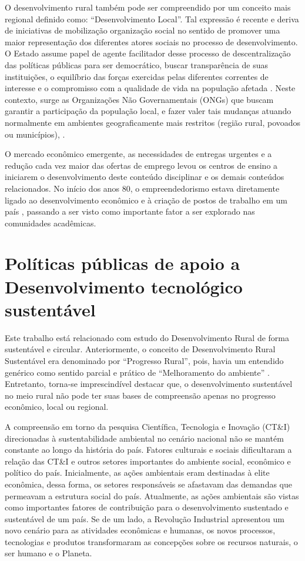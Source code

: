 O desenvolvimento rural também pode ser compreendido por um conceito mais regional definido como: “Desenvolvimento Local”. Tal expressão é recente e deriva de iniciativas de mobilização organização social no sentido de promover uma maior representação dos diferentes atores sociais no processo de desenvolvimento. O Estado assume papel de agente facilitador desse processo de descentralização das políticas públicas para ser democrático, buscar transparência de suas instituições, o equilíbrio das forças exercidas pelas diferentes correntes de interesse e o compromisso com a qualidade de vida na população afetada \cite{castro_agricultura_2017}.
 Neste contexto, surge as Organizações Não Governamentais (ONGs) que buscam garantir a participação da população local, e fazer valer tais mudanças atuando normalmente em ambientes geograficamente mais restritos (região rural, povoados ou municípios), \cite{assis_agricultura_2005, teixeira_o_2016}.


O mercado econômico emergente, as necessidades de entregas urgentes e a redução cada vez maior das ofertas de emprego levou os centros de ensino a iniciarem o desenvolvimento deste conteúdo disciplinar e os demais conteúdos relacionados. No início dos anos 80, o empreendedorismo estava diretamente ligado ao desenvolvimento econômico e à criação de postos de trabalho em um país \cite{rodrigues_intencao_2019}, passando a ser visto como importante fator a ser explorado nas comunidades acadêmicas. 



\section{Políticas públicas de apoio a Desenvolvimento tecnológico sustentável}

Este trabalho está relacionado com estudo do Desenvolvimento Rural de forma sustentável e circular. Anteriormente, o conceito de Desenvolvimento Rural Sustentável era denominado por “Progresso Rural”, pois, havia um entendido genérico como sentido parcial e prático de “Melhoramento do ambiente” \cite{almeida_da_1995}. Entretanto, torna-se imprescindível destacar que, o desenvolvimento sustentável no meio rural não pode ter suas bases de compreensão apenas no progresso econômico, local ou regional.

A compreensão em torno da pesquisa Científica, Tecnologia e Inovação (CT\&I) direcionadas à sustentabilidade ambiental no cenário nacional não se mantém constante ao longo da história do país. Fatores culturais e sociais dificultaram a relação das CT\&I e outros setores importantes do ambiente social, econômico e político do país. Inicialmente, as ações ambientais eram destinadas à elite econômica, dessa forma, os setores responsáveis se afastavam das demandas que permeavam a estrutura social do país. Atualmente, as ações ambientais são vistas como importantes fatores de contribuição para o desenvolvimento sustentado e sustentável de um país. Se de um lado, a Revolução Industrial apresentou um novo cenário para as atividades econômicas e humanas, os novos processos, tecnologias e produtos transformaram as concepções sobre os recursos naturais, o ser humano e o Planeta.

